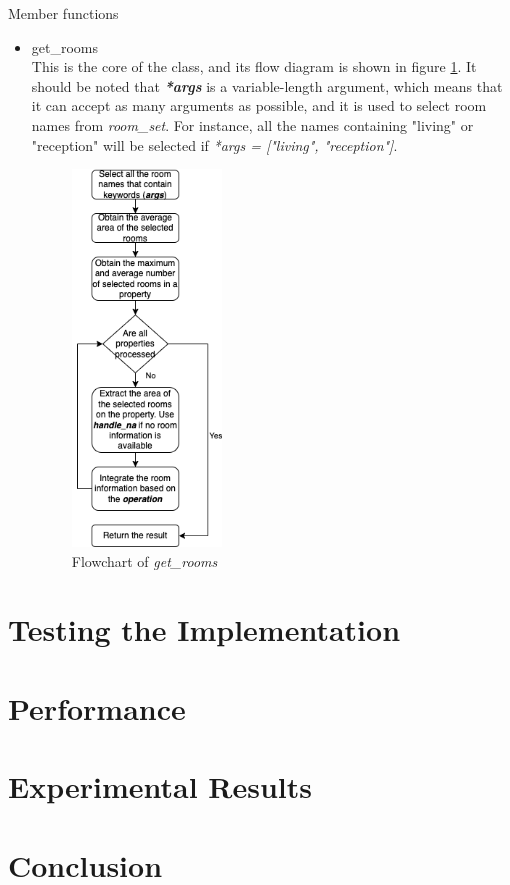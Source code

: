 \documentclass[12pt,twoside]{report}
\begin{document}
Member functions
\begin{itemize}
	\item get\_rooms \\
	This is the core of the class, and its flow diagram is shown in figure \ref{extract_room_get_rooms}. It should be noted that \textit{\textbf{*args}} is a variable-length argument, which means that it can accept as many arguments as possible, and it is used to select room names from \textit{room\_set}. For instance, all the names containing "living" or "reception" will be selected if \textit{*args = ["living", "reception"]}. 
	\begin{figure}[h]
		\centering
		\includegraphics[height=10cm]{extract_room_get_rooms}
		\caption{Flowchart of \textit{get\_rooms}}
		\label{extract_room_get_rooms}
	\end{figure}
\end{itemize}


\chapter{Testing the Implementation}

\chapter{Performance}


\chapter{Experimental Results}


\chapter{Conclusion}




\end{document}
